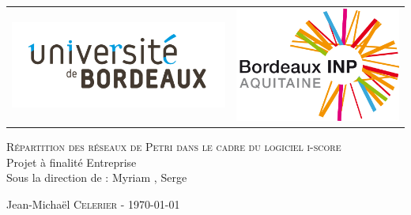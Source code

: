 \begin{titlepage}
  \begin{center}
  	
	\begin{tabular}{cc}
		\includegraphics[scale=0.3]{images/UnivBdx.jpg} & \includegraphics[scale=0.3]{images/BordeauxINP.jpg}
	\end{tabular}


	\begin{spacing}{1.7}
    \textsc{\Huge Répartition des réseaux de Petri dans le cadre du logiciel i-score}\\[1cm]
    {\huge Projet à finalité Entreprise}\\[1cm]
    {\Large Sous la direction de : }
    {\Large Myriam ,
     Serge }
    \end{spacing}
  \end{center}
  
  \begin{flushbottom}
   \begin{flushleft}
    \large Jean-Michaël \textsc{Celerier} - \today \\
   \end{flushleft}
  \end{flushbottom}
\end{titlepage}
\clearpage

